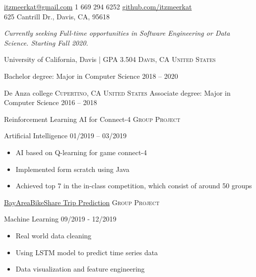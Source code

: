 \documentclass[10pt,a4paper]{article}
\begin{document}
\sloppy
{}

\nobreakvspace{0.3em}
\noindent\href{mailto:itzmeerkat@gmail.com}
{itzmeerkat\mbox{}@\mbox{}gmail.com}
\sbull
\textsmaller{+}1 669 294 6252
\sbull
\href{https://github.com/itzmeerkat}{github.com/itzmeerkat}\\625 Cantrill Dr., Davis, CA, 95618
\spacedhrule{0.9em}{-0.4em}


\noindent \emph{Currently seeking Full-time opportunities in Software Engineering or Data Science. Starting Fall 2020.}

\spacedhrule{0.9em}{-0.4em}

\headedsection
{University of California, Davis | GPA 3.504  }
{\textsc{Davis, CA United States}} {
  
  \headedsubsection
  {Bachelor degree: Major in Computer Science}
  {2018 -- 2020}
  {
  }
}

\headedsection
{De Anza college}
{\textsc{Cupertino, CA United States}} {
  \headedsubsection
  {Associate degree: Major in Computer Science}
  {2016 -- 2018}
  {
  }
}
\spacedhrule{0.9em}{-0.4em}


\headedsection
  {Reinforcement Learning AI for Connect-4}
  {\textsc{Group Project}} {
  \headedsubsection
    {Artificial Intelligence}
    {01/2019 – 03/2019}
    {
      \begin{itemize}
      \item AI based on Q-learning for game connect-4
      \item Implemented form scratch using Java
      \item Achieved top 7 in the in-class competition, which consist of around 50 groups
      \end{itemize}
    }
}
\vspace{0.5em}

\headedsection
  {\href{https://github.com/itzMeerkat/UCDavis-ECS171-2019Fall-Project}{BayAreaBikeShare Trip Prediction}}
  {\textsc{Group Project}} {
  \headedsubsection
    {Machine Learning}
    {09/2019 - 12/2019}
    {\begin{itemize}
      \item Real world data cleaning
      \item Using LSTM model to predict time series data
      \item Data visualization and feature engineering
    \end{itemize}}
  }
\end{document}
